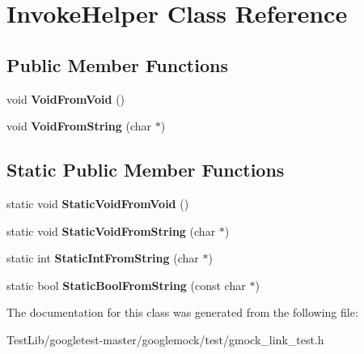 \hypertarget{classInvokeHelper}{}\section{Invoke\+Helper Class Reference}
\label{classInvokeHelper}
\subsection*{Public Member Functions}
\begin{DoxyCompactItemize}
\item 
\mbox{\label{classInvokeHelper_a6371bcb64a8f01093f6fdef60776a031}} 
void {\bfseries Void\+From\+Void} ()
\item 
\mbox{\label{classInvokeHelper_a89f02dc384e6b5a7d935b7ea0a81cc9e}} 
void {\bfseries Void\+From\+String} (char $\ast$)
\end{DoxyCompactItemize}
\subsection*{Static Public Member Functions}
\begin{DoxyCompactItemize}
\item 
\mbox{\label{classInvokeHelper_ae96b5bd7c4fa328d0a87bc986f135fe8}} 
static void {\bfseries Static\+Void\+From\+Void} ()
\item 
\mbox{\label{classInvokeHelper_a5e95ce4214e89b180da9953d94396536}} 
static void {\bfseries Static\+Void\+From\+String} (char $\ast$)
\item 
\mbox{\label{classInvokeHelper_a5cfb11cca70ec5a9f59e8b7a4d4c2f85}} 
static int {\bfseries Static\+Int\+From\+String} (char $\ast$)
\item 
\mbox{\label{classInvokeHelper_aef16e38107cd8ddc0a52d7d0ab153211}} 
static bool {\bfseries Static\+Bool\+From\+String} (const char $\ast$)
\end{DoxyCompactItemize}


The documentation for this class was generated from the following file\+:\begin{DoxyCompactItemize}
\item 
Test\+Lib/googletest-\/master/googlemock/test/gmock\+\_\+link\+\_\+test.\+h\end{DoxyCompactItemize}
